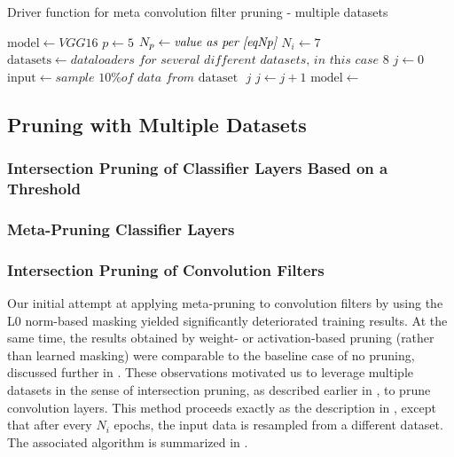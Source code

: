 \documentclass{article}
\begin{document}
\begin{algorithm}[t]
	\caption{Driver function for meta convolution filter pruning - multiple datasets} \label{FilterPruneDriverMeta}
	\begin{algorithmic}[1]	
		\State $\mathrm{model} \gets \textit{VGG16}$
		\State $p \gets 5$
		\State $N_p \gets \textit{value as per \eqref{eqNp}}$
		\State $N_i \gets 7$
		\State $\mathrm{datasets} \gets \textit{dataloaders for several different datasets, in this case $8$}$
		\State $j \gets 0$
				\State $\mathrm{input} \gets \textit{sample 10\% of data from $\mathrm{dataset}$ }j$
				\State $j \gets j + 1$
			\EndIf
			\State $\mathrm{model} \gets $ 
		\EndWhile
	\end{algorithmic}
\end{algorithm}

\subsection{Pruning with Multiple Datasets}

\subsubsection{Intersection Pruning of Classifier Layers Based on a Threshold} \label{intersectPruneClass}


\subsubsection{Meta-Pruning Classifier Layers} \label{metaPruneClass}


\subsubsection{Intersection Pruning of Convolution Filters} \label{intersectPruneFilter}

Our initial attempt at applying meta-pruning to convolution filters by using the L0 norm-based masking yielded significantly deteriorated training results. At the same time, the results obtained by weight- or activation-based pruning (rather than learned masking) were comparable to the baseline case of no pruning, discussed further in . These observations motivated us to leverage multiple datasets in the sense of intersection pruning, as described earlier in , to prune convolution layers. This method proceeds exactly as the description in , except that after every $N_i$ epochs, the input data is resampled from a different dataset. The associated algorithm is summarized in .
\end{document}
